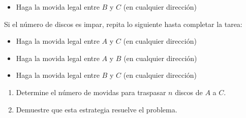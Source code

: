 \begin{enumerate}
\begin{itemize}
    \item
      Haga la movida legal entre \(B\) y \(C\)
      (en cualquier dirección)
    \end{itemize}
    Si el número de discos es impar,
    repita lo siguiente hasta completar la tarea:
    \begin{itemize}
    \item
      Haga la movida legal entre \(A\) y \(C\)
      (en cualquier dirección)
    \item
      Haga la movida legal entre \(A\) y \(B\)
      (en cualquier dirección)
    \item
      Haga la movida legal entre \(B\) y \(C\)
      (en cualquier dirección)
    \end{itemize}
    \begin{enumerate}
    \item
      Determine el número de movidas para traspasar \(n\) discos
      de \(A\) a \(C\).
    \item
      Demuestre que esta estrategia resuelve el problema.
    \end{enumerate}
  \end{enumerate}





